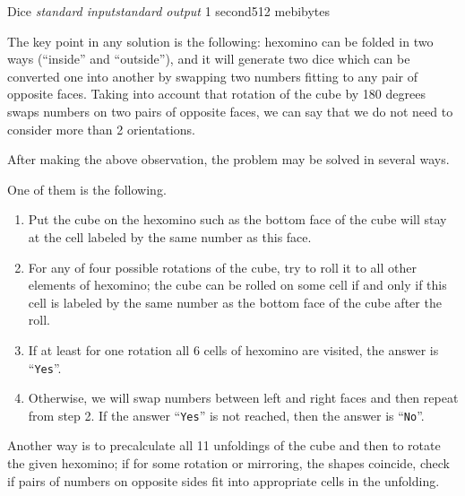 \begin{problem}{Dice}
{\textsl{standard input}}{\textsl{standard output}}
{1 second}{512 mebibytes}{}

The key point in any solution is the following:
hexomino can be folded in two ways (``inside'' and ``outside''),
and it will generate two dice which can be converted one into another
by swapping two numbers fitting to any pair of opposite faces.
Taking into account that rotation of the cube by 180 degrees swaps
numbers on two pairs of opposite faces, we can say that we do not need
to consider more than 2 orientations. 

After making the above observation, the problem may be solved in several ways.

One of them is the following. 

\begin{enumerate}
\item Put the cube on the hexomino such as the bottom face of the cube
will stay at the cell labeled by the same number as this face. 

\item For any of four possible rotations of the cube, try to roll it to
all other elements of hexomino; the cube can be rolled on
some cell if and only if this cell is labeled by the same number
as the bottom face of the cube after the roll.

\item If at least for one rotation all 6 cells of hexomino are visited,
the answer is ``\texttt{Yes}''. 

\item Otherwise, we will swap numbers between left and right faces and then
repeat from step 2. If the answer ``\texttt{Yes}'' is not reached,
then the answer is ``\texttt{No}''.
\end{enumerate}

Another way is to precalculate all 11 unfoldings of the cube and then to
rotate the given hexomino; if for some rotation or mirroring, the shapes
coincide, check if pairs of numbers on opposite sides fit into
appropriate cells in the unfolding.

\end{problem}
